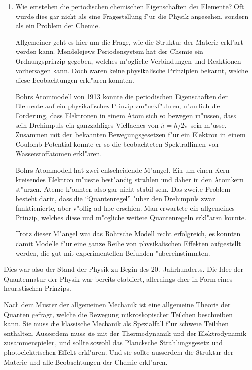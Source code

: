 \begin{enumerate}
\item Wie entstehen die periodischen chemischen Eigenschaften der
Elemente? Oft wurde dies gar nicht als eine Fragestellung f"ur die
Physik angesehen, sondern als ein Problem der Chemie.

Allgemeiner geht es hier um die Frage, wie die Struktur der Materie
erkl"art werden kann.
Mendelejews Periodensystem hat der Chemie ein Ordnungsprinzip gegeben,
welches m"ogliche Verbindungen und Reaktionen vorhersagen kann.
Doch waren keine physikalische Prinzipien bekannt, welche diese Beobachtungen
erkl"aren konnten.

Bohrs Atommodell von 1913 konnte die periodischen Eigenschaften der Elemente
auf ein physikalisches Prinzip zur"uckf"uhren, n"amlich die Forderung,
dass Elektronen in einem Atom sich so bewegen m"ussen, dass sein Drehimpuls
ein ganzzahliges Vielfaches von $\hbar = h/2\pi$ sein m"usse.
Zusammen mit den bekannten Bewegungsgesetzen f"ur ein Elektron in einem
Coulomb-Potential konnte er so die beobachteten Spektrallinien von
Wasserstoffatomen erkl"aren. 

Bohrs Atommodell hat zwei entscheidende M"angel.
Ein um einen Kern kreisendes Elektron m"usste best"andig strahlen
und daher in den Atomkern st"urzen. Atome k"onnten also gar nicht
stabil sein.
Das zweite Problem besteht darin, dass die ``Quantenregel'' "uber den 
Drehimpuls zwar funktionierte, aber v"ollig ad hoc erschien.
Man erwartete ein allgemeines Prinzip, welches diese und m"ogliche
weitere Quantenregeln erkl"aren konnte.

Trotz dieser M"angel war das Bohrsche Modell recht erfolgreich, es
konnten damit Modelle f"ur eine ganze Reihe von physikalischen Effekten
aufgestellt werden, die gut mit experimentellen Befunden "ubereinstimmten.
\end{enumerate}
Dies war also der Stand der Physik zu Begin des 20.~Jahrhunderts.
Die Idee der Quantennatur der Physik war bereits etabliert, allerdings
eher in Form eines heuristischen Prinzips.

Nach dem Muster der allgemeinen Mechanik ist eine allgemeine
Theorie der Quanten gefragt, welche die Bewegung mikroskopischer Teilchen
beschreiben kann. Sie muss die klassische Mechanik als Spezialfall
f"ur schwere Teilchen enthalten. Ausserdem muss sie mit der
Thermodynamik und der Elektrodynamik zusammenspielen, und sollte
sowohl das Plancksche Strahlungsgesetz und photoelektrischen
Effekt erkl"aren.
Und sie sollte ausserdem die Struktur der Materie und alle Beobachtungen
der Chemie erkl"aren.

